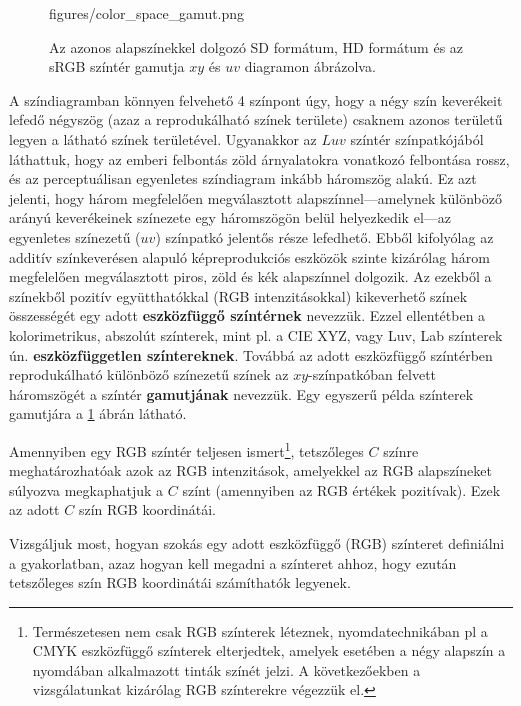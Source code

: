 \begin{figure}[]
	\centering
	\begin{overpic}[width = 1\columnwidth ]{figures/color_space_gamut.png}
	\end{overpic}
	\caption{Az azonos alapszínekkel dolgozó SD formátum, HD formátum és az sRGB színtér gamutja $xy$ és $uv$ diagramon ábrázolva.}
	\label{Fig:gamut}
\end{figure}

A színdiagramban könnyen felvehető 4 színpont úgy, hogy a négy szín keverékeit lefedő négyszög (azaz a reprodukálható színek területe) csaknem azonos területű legyen a látható színek területével.
Ugyanakkor az $Luv$ színtér színpatkójából láthattuk, hogy az emberi felbontás zöld árnyalatokra vonatkozó felbontása rossz, és az perceptuálisan egyenletes színdiagram inkább háromszög alakú.
Ez azt jelenti, hogy három megfelelően megválasztott alapszínnel---amelynek különböző arányú keverékeinek színezete egy háromszögön belül helyezkedik el---az egyenletes színezetű ($uv$) színpatkó jelentős része lefedhető.
Ebből kifolyólag az additív színkeverésen alapuló képreprodukciós eszközök szinte kizárólag három megfelelően megválasztott piros, zöld és kék alapszínnel dolgozik.
Az ezekből a színekből pozitív együtthatókkal (RGB intenzitásokkal) kikeverhető színek összességét egy adott \textbf{eszközfüggő színtérnek} nevezzük.
Ezzel ellentétben a kolorimetrikus, abszolút színterek, mint pl. a CIE XYZ, vagy Luv, Lab színterek ún. \textbf{eszközfüggetlen színtereknek}.
Továbbá az adott eszközfüggő színtérben reprodukálható különböző színezetű színek az $xy$-színpatkóban felvett háromszögét a színtér \textbf{gamutjának} nevezzük.
Egy egyszerű példa színterek gamutjára a \ref{Fig:gamut} ábrán látható.

Amennyiben egy RGB színtér teljesen ismert\footnote{Természetesen nem csak RGB színterek léteznek, nyomdatechnikában pl a CMYK eszközfüggő színterek elterjedtek, amelyek esetében a négy alapszín a nyomdában alkalmazott tinták színét jelzi.
A következőekben a vizsgálatunkat kizárólag RGB színterekre végezzük el.}, tetszőleges $C$ színre meghatározhatóak azok az RGB intenzitások, amelyekkel az RGB alapszíneket súlyozva megkaphatjuk a $C$ színt (amennyiben az RGB értékek pozitívak).
Ezek az adott $C$ szín RGB koordinátái.

Vizsgáljuk most, hogyan szokás egy adott eszközfüggő (RGB) színteret definiálni a gyakorlatban, azaz hogyan kell megadni a színteret ahhoz, hogy ezután tetszőleges szín RGB koordinátái számíthatók legyenek.

